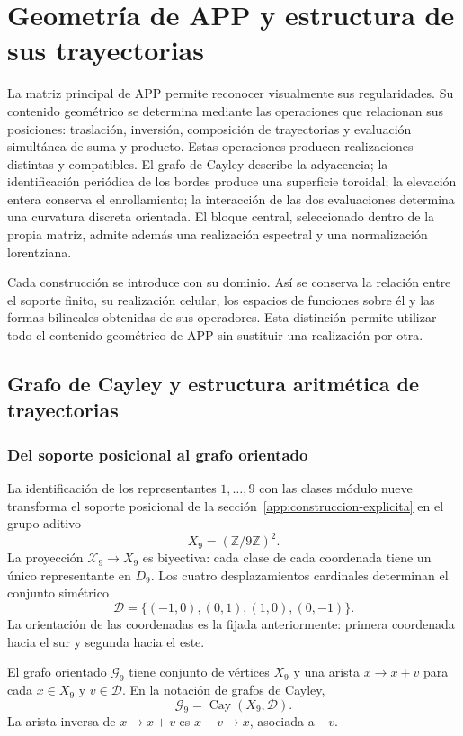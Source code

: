 \section{Geometría de APP y estructura de sus trayectorias}
\label{geo:chap}

La matriz principal de APP permite reconocer visualmente sus regularidades. Su contenido geométrico se determina mediante las operaciones que relacionan sus posiciones: traslación, inversión, composición de trayectorias y evaluación simultánea de suma y producto. Estas operaciones producen realizaciones distintas y compatibles. El grafo de Cayley describe la adyacencia; la identificación periódica de los bordes produce una superficie toroidal; la elevación entera conserva el enrollamiento; la interacción de las dos evaluaciones determina una curvatura discreta orientada. El bloque central, seleccionado dentro de la propia matriz, admite además una realización espectral y una normalización lorentziana.

Cada construcción se introduce con su dominio. Así se conserva la relación entre el soporte finito, su realización celular, los espacios de funciones sobre él y las formas bilineales obtenidas de sus operadores. Esta distinción permite utilizar todo el contenido geométrico de APP sin sustituir una realización por otra.

\subsection{Grafo de Cayley y estructura aritmética de trayectorias}
\label{geo:cayley}

\subsubsection{Del soporte posicional al grafo orientado}

La identificación de los representantes $1,\ldots,9$ con las clases módulo nueve transforma el soporte posicional de la sección~\ref{app:construccion-explicita} en el grupo aditivo
\[
 X_9=(\mathbb Z/9\mathbb Z)^2.
\]
La proyección $\mathcal X_9\to X_9$ es biyectiva: cada clase de cada coordenada tiene un único representante en $D_9$. Los cuatro desplazamientos cardinales determinan el conjunto simétrico
\[
 \mathscr D=\{(-1,0),(0,1),(1,0),(0,-1)\}.
\]
La orientación de las coordenadas es la fijada anteriormente: primera coordenada hacia el sur y segunda hacia el este.

\begin{definicion}
\label{geo:def-grafo}
El grafo orientado $\mathscr G_9$ tiene conjunto de vértices $X_9$ y una arista $x\to x+v$ para cada $x\in X_9$ y $v\in\mathscr D$. En la notación de grafos de Cayley,
\[
 \mathscr G_9=\operatorname{Cay}(X_9,\mathscr D).
\]
La arista inversa de $x\to x+v$ es $x+v\to x$, asociada a $-v$.
\end{definicion}


